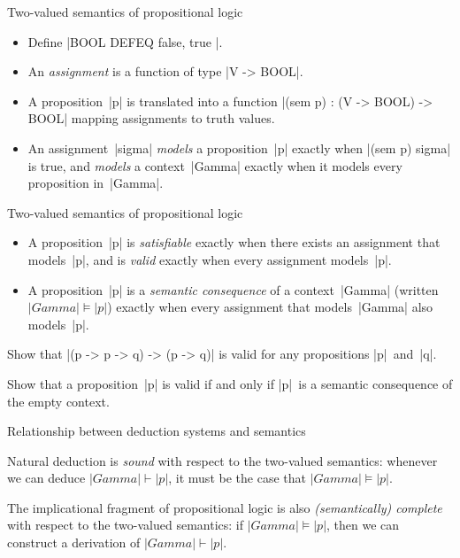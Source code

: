 \documentclass[t,compress,hyperref={hidelinks}]{beamer}
\begin{document}
\begin{frame}{Two-valued semantics of propositional logic}

\begin{itemize}

\item Define |BOOL DEFEQ { false, true }|.

\item An \emph{assignment} is a function of type |V -> BOOL|.

\item A proposition~|p| is translated into a function |(sem p) : (V -> BOOL) -> BOOL| mapping assignments to truth values.

\item An assignment~|sigma| \emph{models} a proposition~|p| exactly when |(sem p) sigma| is true, and \emph{models} a context~|Gamma| exactly when it models every proposition in~|Gamma|.

\end{itemize}

\end{frame}

\begin{frame}{Two-valued semantics of propositional logic}

\begin{itemize}

\item A proposition~|p| is \emph{satisfiable} exactly when there exists an assignment that models~|p|, and is \emph{valid} exactly when every assignment models~|p|.

\item A proposition~|p| is a \emph{semantic consequence} of a context~|Gamma| (written $|Gamma| \models |p|$) exactly when every assignment that models~|Gamma| also models~|p|.

\end{itemize}

 Show that |(p -> p -> q) -> (p -> q)| is valid for any propositions |p|~and~|q|.

 Show that a proposition~|p| is valid if and only if |p|~is a semantic consequence of the empty context.

\end{frame}

\begin{frame}{Relationship between deduction systems and semantics}

Natural deduction is \emph{sound} with respect to the two-valued semantics: whenever we can deduce $|Gamma| \vdash |p|$, it must be the case that $|Gamma| \models |p|$.

The implicational fragment of propositional logic is also \emph{(semantically) complete} with respect to the two-valued semantics: if $|Gamma| \models |p|$, then we can construct a derivation of $|Gamma| \vdash |p|$.

\end{frame}
\end{document}
